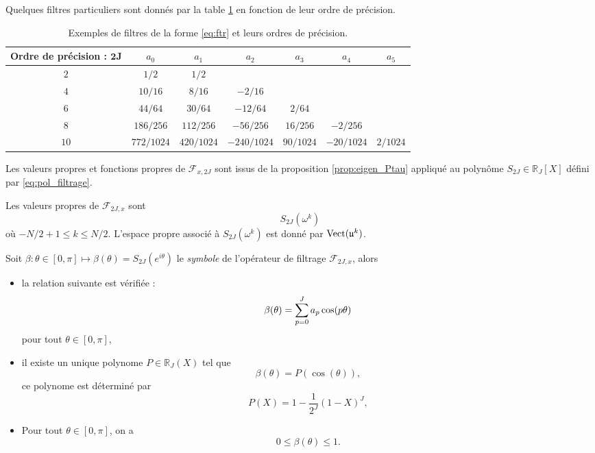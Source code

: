 Quelques filtres particuliers sont donnés par la table \ref{tab:filter} en fonction de leur ordre de précision.
\begin{table}[htbp]
\begin{center}
\begin{tabular}{|c||cccccc|}
\hline
\textbf{Ordre de précision : }$\mathbf{2J}$ & $a_0$ & $a_1$ & $a_2$ & $a_3$ & $a_4$ & $a_5$ \\
\hline \hline
$2$ & $1/2$ & $1/2$ & & & & \\
\hline
$4$ & $10/16$ & $8/16$ & $-2/16$ & & & \\
\hline
$6$ & $44/64$ & $30/64$ & $-12/64$ & $2/64$ & & \\
\hline
$8$ & $186/256$ & $112/256$ & $-56/256$ & $16/256$ & $-2/256$ & \\
\hline
$10$ & $772/1024$ & $420/1024$ & $-240/1024$ & $90/1024$ & $-20/1024$ & $2/1024$ \\
\hline
\end{tabular}
\end{center}
\caption{Exemples de filtres de la forme \eqref{eq:ftr} et leurs ordres de précision.}
\label{tab:filter}
\end{table}

Les valeurs propres et fonctions propres de $\mathcal{F}_{x,2J}$ sont issus de la proposition \ref{prop:eigen_Ptau} appliqué au polynôme $S_{2J} \in \mathbb{R}_J [X]$ défini par \eqref{eq:pol_filtrage}.

\begin{proposition}
Les valeurs propres de $\mathcal{F}_{2J,x}$ sont 
\begin{equation}
S_{2J} (\omega^k)
\end{equation}
où $-N/2+1 \leq k \leq N/2$. L'espace propre associé à $S_{2J} (\omega^k)$ est donné par $\text{Vect}( \mathfrak{u}^k )$.
\label{prop:eigen_filtre}
\end{proposition}

\begin{theoreme}
Soit $\beta : \theta \in [0, \pi] \mapsto \beta(\theta) = S_{2J}(e^{i \theta})$ le \textit{symbole} de l'opérateur de filtrage $\mathcal{F}_{2J,x}$, alors
\begin{itemize}
\item la relation suivante est vérifiée :
\begin{equation}
\beta(\theta) = \displaystyle\sum\limits_{p=0}^J a_p \cos (p \theta)
\end{equation}
pour tout $\theta \in [0, \pi]$,
\item il existe un unique polynome $P \in \mathbb{R}_{J}(X)$ tel que
\begin{equation}
\beta(\theta) = P(\cos (\theta)),
\end{equation}
ce polynome est déterminé par
\begin{equation}
P(X) = 1 - \dfrac{1}{2^J}(1-X)^J,
\end{equation}
\item Pour tout $\theta \in [0, \pi]$, on a
\begin{equation}
0 \leq \beta(\theta) \leq 1.
\end{equation}
\end{itemize}
\label{th:filtre_dissipatif}
\end{theoreme}

